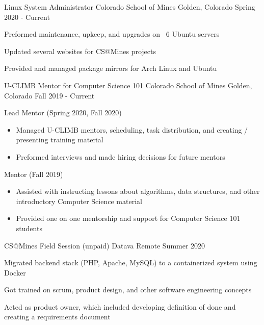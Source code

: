 \begin{cventries}
    \cventry
    {Linux System Administrator}
    {Colorado School of Mines}
    {Golden, Colorado}
    {Spring 2020 - Current}
    {
        \begin{cvitems}
        \item Preformed maintenance, upkeep, and upgrades on ~6 Ubuntu servers
        \item Updated several websites for CS@Mines projects
        \item Provided and managed package mirrors for Arch Linux and Ubuntu
        \end{cvitems}
    }


    \cventry
    	{U-CLIMB Mentor for Computer Science 101}
    	{ Colorado School of Mines }
    	{ Golden, Colorado}
	   	 {Fall 2019 - Current}
   	 {
   	 \begin{cvitems}
         \item {Lead Mentor (Spring 2020, Fall 2020)}
         \begin{itemize}
         \item {Managed U-CLIMB mentors, scheduling, task
    	distribution, and creating /
      presenting training material}
          \item {Preformed interviews and made hiring decisions for future mentors}
         \end{itemize}
         \ifcv
         \item {Mentor (Fall 2019)}
         \begin{itemize}
            	 \item {Assisted with instructing lessons about algorithms, data structures, and other introductory Computer Science material}
   	         \item {Provided one on one mentorship and support for
    	Computer Science 101 students}
        \end{itemize}
        \fi
      \end{cvitems}
      }

      \ifcv
    \cventry
    {CS@Mines Field Session (unpaid)}
    {Datava}
    {Remote}
    {Summer 2020}
    {
      \begin{cvitems}
        \item Migrated backend stack (PHP, Apache, MySQL) to a containerized system using Docker
        \item Got trained on scrum, product design, and other software engineering concepts
        \item Acted as product owner, which included developing definition of done and creating a requirements document
      \end{cvitems}
    }


\end{cventries}
